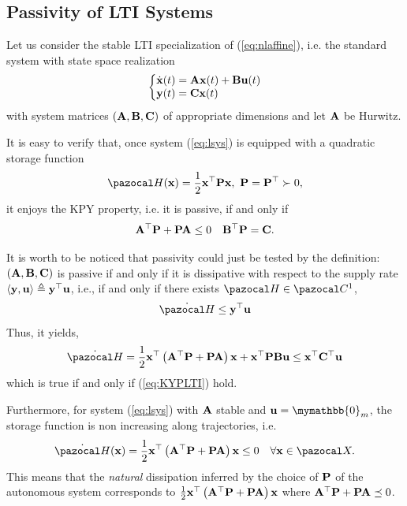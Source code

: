 \subsection{Passivity of LTI Systems}
%
Let us consider the stable LTI specialization of (\ref{eq:nlaffine}), i.e. the standard system with state space realization
%
\begin{equation}\label{eq:lsys}
\left\{
\begin{matrix*}[l]
\dot{\xb}(t) = \Ab\xb(t) + \Bb\ub(t)\\
\yb(t) = \Cb\xb(t)
\end{matrix*}
\right.
\end{equation}
with system matrices $(\mathbf{A},\mathbf{B},\mathbf{C})$ of appropriate dimensions and let $\mathbf{A}$ be Hurwitz.
%
{
It is easy to verify that, once system (\ref{eq:lsys}) is equipped with a quadratic storage function 
\begin{equation}
    \Ha(\xb) = \frac{1}{2}\xb^\top \Pb\xb,~\Pb = \Pb^\top \succ 0,
\end{equation}
it enjoys the KPY property, i.e. it is passive, if and only if
%
\begin{equation}\label{eq:KYPLTI}
        \mathbf{A}^\top \mathbf{P} + \mathbf{P}\mathbf{A} \leq 0\quad
        \mathbf{B}^\top \mathbf{P} = \mathbf{C}.
\end{equation}
%
\begin{rem}
    It is worth to be noticed that passivity could just be tested by the definition:
    $(\mathbf{A},\mathbf{B},\mathbf{C})$ is passive if and only if it is dissipative with respect to the supply rate $\langle \mathbf{y},\mathbf{u} \rangle\triangleq \mathbf{y}^\top \mathbf{u}$, i.e.,  if and only if there exists $\Ha\in\C^1$,
    \begin{equation}
        \dot{\Ha}\leq \yb^\top \ub
    \end{equation}
    Thus, it yields,
    \begin{align}
        \dot{\Ha} =  \frac{1}{2}\xb^\top \left(\Ab^\top \Pb + \Pb\Ab\right)\xb + \xb^\top \Pb\Bb\ub \leq \xb^\top \Cb^\top \ub
    \end{align}
    which is true if and only if (\ref{eq:KYPLTI}) hold.
\end{rem}
%
Furthermore, for system (\ref{eq:lsys}) with $\mathbf{A}$ stable and $\ub=\mymathbb{0}_m$, the storage function is non increasing along trajectories, i.e.
%
\begin{equation}
    \dot{\Ha}(\xb) =  \frac{1}{2}\xb^\top \left(\Ab^\top \Pb + \Pb\Ab\right)\xb\leq 0\quad\forall \xb\in\X.
\end{equation}
%
This means that the \textit{natural} dissipation inferred by the choice of $\mathbf{P}$ of the autonomous system corresponds to $\frac{1}{2}\mathbf{x}^\top \left(\mathbf{A}^\top \mathbf{P} + \mathbf{P}\mathbf{A}\right)\mathbf{x}$ where $\mathbf{A}^\top\mathbf{P}+\mathbf{P}\mathbf{A}\preceq 0$. 
}
